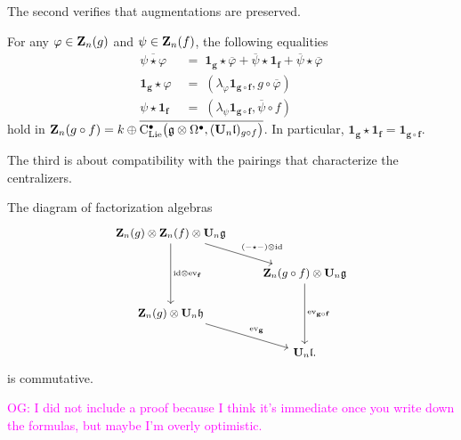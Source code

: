 \documentclass[11pt]{amsart}
\numberwithin{equation}{section}
\def\owen{\textcolor{magenta}{OG: }\textcolor{magenta}}
\begin{document}
The second verifies that augmentations are preserved.

\begin{lmm}
\label{L:compisaugmented} 
For any $\varphi \in \mathbf Z_n(g)$ and
$\psi \in \mathbf Z_n(f)$,
the following equalities 
\begin{align}
\overline{\psi\star \varphi} &\;= \;\mathbf{1_g}\star \overline{\varphi} +\overline{\psi}\star \mathbf{1_f} +\overline{\psi}\star \overline{\varphi} \\
\mathbf{1_g}\star \varphi &\;=\;  (\lambda_\varphi \mathbf{1_{g \circ f}}, g\circ \overline{\varphi})\\
\psi \star \mathbf{1_f} &\;=\; (\lambda_\psi \mathbf{1_{g \circ f}}, \overline{\psi} \circ f) 
\end{align}
hold in $\mathbf Z_n(g \circ f) = k  \oplus \overline{{\rm C}_{\rm Lie}^\bullet\big(\mathfrak g \otimes \Omega^\bullet, (\mathbf U_n \mathfrak l)_{g \circ f}  \big)}$.
In particular, $\mathbf{1_g} \star \mathbf{1_f} =\mathbf{1_{g \circ f}}$.
\end{lmm}

The third is about compatibility with the pairings that characterize the centralizers.
 
\begin{lmm}
\label{L:NatPptyofComp}
 The diagram of factorization algebras 
 \[
 \small
 \begin{tikzcd}
 \bZ_n(g)
 \otimes  \bZ_n(f) \otimes \bU_n \fg \arrow[rd, "(-\star-)\otimes \id"]
 \arrow[dd, "\id\otimes \ev_ {\mathbf{f}}"]& \\ 
 & \bZ_n(g \circ f)
 \otimes \bU_n \fg
 \arrow[dd, "\ev_{\mathbf{g}\circ \mathbf{f}}"]\\
\bZ_n(g) \otimes \bU_n \fh  \arrow[rd, "\ev_{\mathbf{g}}"] & \\  
 & \bU_n \fl. 
\end{tikzcd}
\]
 is commutative.
\end{lmm}

\owen{I did not include a proof because I think it's immediate once you write down the formulas,
but maybe I'm overly optimistic.}
\end{document}
